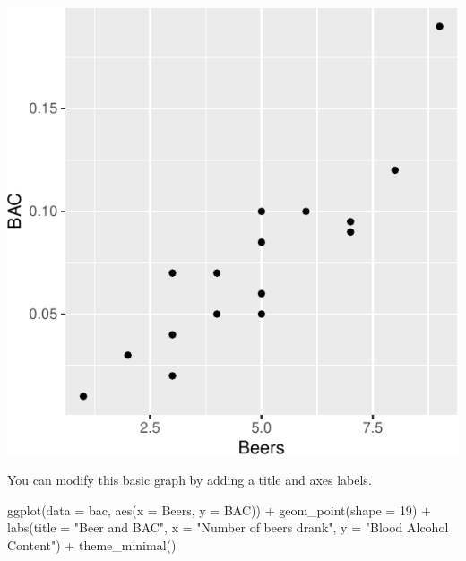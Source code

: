 \documentclass[
]{book}
\newenvironment{Shaded}{\begin{snugshade}}{\end{snugshade}}
\newcommand{\AttributeTok}[1]{\textcolor[rgb]{0.77,0.63,0.00}{#1}}
\newcommand{\DecValTok}[1]{\textcolor[rgb]{0.00,0.00,0.81}{#1}}
\newcommand{\FunctionTok}[1]{\textcolor[rgb]{0.00,0.00,0.00}{#1}}
\newcommand{\NormalTok}[1]{#1}
\newcommand{\SpecialCharTok}[1]{\textcolor[rgb]{0.00,0.00,0.00}{#1}}
\newcommand{\StringTok}[1]{\textcolor[rgb]{0.31,0.60,0.02}{#1}}
\begin{document}
\includegraphics[width=1\linewidth]{Class_Activity_6_files/figure-latex/unnamed-chunk-2-1}

You can modify this basic graph by adding a title and axes labels.

\begin{Shaded}
\begin{Highlighting}[]
\FunctionTok{ggplot}\NormalTok{(}\AttributeTok{data =}\NormalTok{ bac, }\FunctionTok{aes}\NormalTok{(}\AttributeTok{x =}\NormalTok{ Beers, }\AttributeTok{y =}\NormalTok{ BAC)) }\SpecialCharTok{+} 
     \FunctionTok{geom\_point}\NormalTok{(}\AttributeTok{shape =} \DecValTok{19}\NormalTok{) }\SpecialCharTok{+}
     \FunctionTok{labs}\NormalTok{(}\AttributeTok{title =} \StringTok{"Beer and BAC"}\NormalTok{,}
          \AttributeTok{x =} \StringTok{"Number of beers drank"}\NormalTok{,}
          \AttributeTok{y =} \StringTok{"Blood Alcohol Content"}\NormalTok{) }\SpecialCharTok{+}
     \FunctionTok{theme\_minimal}\NormalTok{()}
\end{Highlighting}
\end{Shaded}
\end{document}
